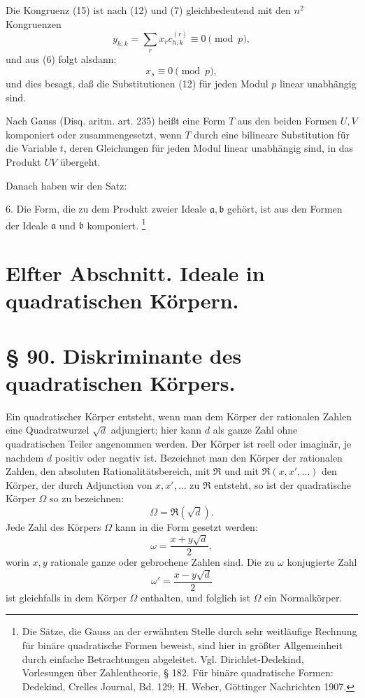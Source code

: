 \documentclass[11pt]{article}
\begin{document}
Die Kongruenz (15) ist nach (12) und (7) gleichbedeutend mit den $n^2$ Kongruenzen
\[
 y_{h,k}=\sum_r x_rc_{h,k}^{(r)}\equiv0\pmod p,
\]
und aus (6) folgt alsdann:
\[
 x_s\equiv0\pmod p,
\]
und dies besagt, daß die Substitutionen (12) für jeden Modul $p$ linear unabhängig sind.

Nach Gauss (Disq. aritm. art. 235) heißt eine Form $T$ aus den beiden Formen $U,V$ komponiert oder zusammengesetzt, wenn $T$ durch eine bilineare Substitution für die Variable $t$, deren Gleichungen für jeden Modul linear unabhängig sind, in das Produkt $UV$ übergeht.

Danach haben wir den Satz:

6. Die Form, die zu dem Produkt zweier Ideale $\mathfrak a,\mathfrak b$ gehört, ist aus den Formen der Ideale $\mathfrak a$ und $\mathfrak b$ komponiert.
\footnote{Die Sätze, die Gauss an der erwähnten Stelle durch sehr weitläufige Rechnung für binäre quadratische Formen beweist, sind hier in größter Allgemeinheit durch einfache Betrachtungen abgeleitet. Vgl. Dirichlet-Dedekind, Vorlesungen über Zahlentheorie, § 182. Für binäre quadratische Formen: Dedekind, Crelles Journal, Bd. 129; H. Weber, Göttinger Nachrichten 1907.}




\section*{Elfter Abschnitt. Ideale in quadratischen Körpern.}

\section*{§ 90. Diskriminante des quadratischen Körpers.}

Ein quadratischer Körper entsteht, wenn man dem Körper der rationalen Zahlen eine Quadratwurzel $\sqrt d$ adjungiert; hier kann $d$ als ganze Zahl ohne quadratischen Teiler angenommen werden. Der Körper ist reell oder imaginär, je nachdem $d$ positiv oder negativ ist. Bezeichnet man den Körper der rationalen Zahlen, den absoluten Rationalitätsbereich, mit $\mathfrak R$ und mit $\mathfrak R(x,x',\ldots)$ den Körper, der durch Adjunction von $x,x',\ldots$ zu $\mathfrak R$ entsteht, so ist der quadratische Körper $\Omega$ so zu bezeichnen:
\begin{equation}
 \Omega=\mathfrak R(\sqrt d).
\tag{1}
\end{equation}
Jede Zahl des Körpers $\Omega$ kann in die Form gesetzt werden:
\begin{equation}
 \omega=\frac{x+y\sqrt d}{2},
\tag{2}
\end{equation}
worin $x,y$ rationale ganze oder gebrochene Zahlen sind. Die zu $\omega$ konjugierte Zahl
\begin{equation}
 \omega'=\frac{x-y\sqrt d}{2}
\tag{3}
\end{equation}
ist gleichfalls in dem Körper $\Omega$ enthalten, und folglich ist $\Omega$ ein Normalkörper.
\end{document}
